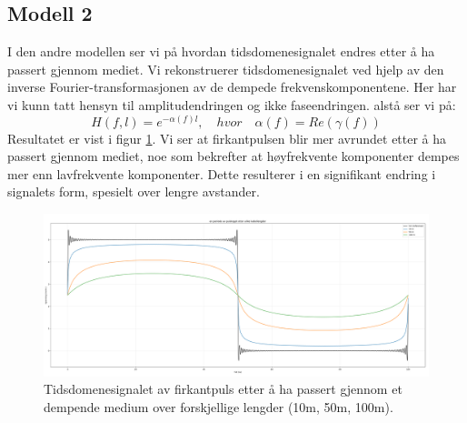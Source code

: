\subsection{Modell 2}
I den andre modellen ser vi på hvordan tidsdomenesignalet endres etter å ha passert gjennom mediet. Vi rekonstruerer tidsdomenesignalet ved hjelp av den inverse Fourier-transformasjonen av de dempede frekvenskomponentene. Her har vi kunn tatt hensyn til amplitudendringen og ikke faseendringen. alstå ser vi på:
\[
    H(f, l) = e^{-\alpha(f) l}, \quad hvor \quad \alpha(f) = Re(\gamma(f))
\]
Resultatet er vist i figur \ref{fig:modell2}. Vi ser at firkantpulsen blir mer avrundet etter å ha passert gjennom mediet, noe som bekrefter at høyfrekvente komponenter dempes mer enn lavfrekvente komponenter. Dette resulterer i en signifikant endring i signalets form, spesielt over lengre avstander.
\begin{figure}[h]
    \centering
    \includegraphics[width=1\textwidth]{Media/modellering2.png}
    \caption{Tidsdomenesignalet av firkantpuls etter å ha passert gjennom et dempende medium over forskjellige lengder (10m, 50m, 100m).}
    \label{fig:modell2}
\end{figure}
\clearpage

